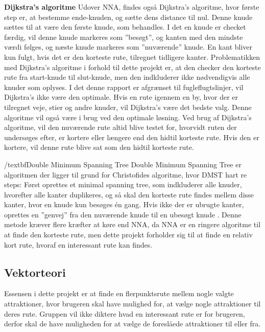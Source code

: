 \textbf{Dijkstra's algoritme}\newline
Udover NNA, findes også Dijkstra’s algoritme, hvor første step er, at bestemme ende-knuden, og sætte dens distance til nul. Denne knude sættes til at være den første knude, som behandles. I det en knude er checket færdig, vil denne knude markeres som ”besøgt”, og kanten med den mindste værdi følges, og næste knude markeres som ”nuværende” knude. En kant bliver kun fulgt, hvis det er den korteste rute, tilregnet tidligere kanter.
Problematikken med Dijkstra’s algoritme i forhold til dette projekt er, at den checker den korteste rute fra start-knude til slut-knude, men den indkluderer ikke nødvendigvis alle knuder som oplyses. I det denne rapport er afgrænset til fugleflugtslinjer, vil Dijkstra’s ikke være den optimale. Hvis en rute igennem en by, hvor der er tilregnet veje, stier og andre knuder, vil Dijkstra’s være det bedste valg. Denne algoritme vil også være i brug ved den optimale løsning. Ved brug af Dijkstra’s algoritme, vil den nuværende rute altid blive testet for, hvorvidt ruten der undersøges efter, er kortere eller længere end den hidtil korteste rute. Hvis den er kortere, vil denne rute blive sat som den hidtil korteste rute. \citep{Dijkstra}

/textbf{Double Minimum Spanning Tree}
Double Minimum Spanning Tree er algoritmen der ligger til grund for Christofides algoritme, hvor DMST hart re steps: Først oprettes et minimal spanning tree, som indkluderer alle knuder, hvorefter alle kanter duplikeres, og så skal den korteste rute findes mellem disse kanter, hvor en knude kun besøges én gang. Hvis ikke der er ubrugte kanter, oprettes en ”genvej” fra den nuværende knude til en ubesøgt knude \citep{DMST}. Denne metode kræver flere kræfter at køre end NNA, da NNA er en ringere algoritme til at finde den korteste rute, men dette projekt forholder sig til at finde en relativ kort rute, hvoraf en interessant rute kan findes.



\subsection{Vektorteori}
Essensen i dette projekt er at finde en flerpunktsrute mellem nogle valgte attraktioner, hvor brugeren skal have mulighed for, at vælge nogle attraktioner til deres rute. Gruppen vil ikke diktere hvad en interessant rute er for brugeren, derfor skal de have muligheden for at vælge de foreslåede attraktioner til eller fra.

